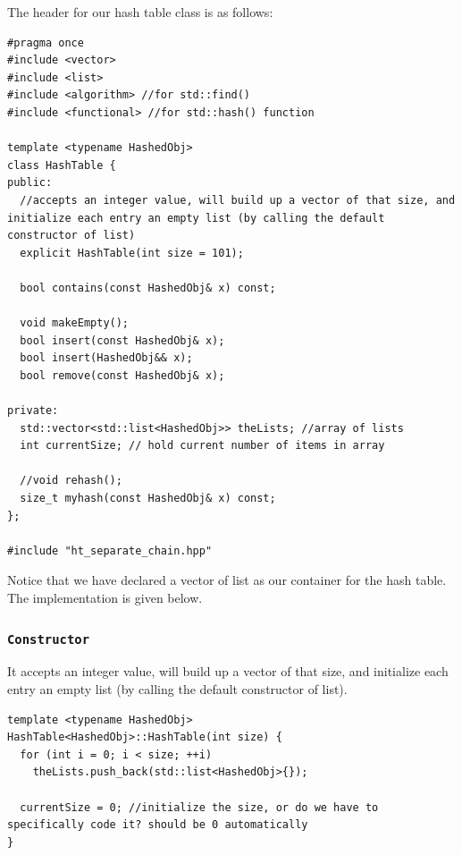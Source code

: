 \documentclass[11pt]{book}
\begin{document}
The header for our hash table class is as follows:
\begin{verbatim}
#pragma once
#include <vector>
#include <list>
#include <algorithm> //for std::find() 
#include <functional> //for std::hash() function

template <typename HashedObj>
class HashTable {
public:
  //accepts an integer value, will build up a vector of that size, and initialize each entry an empty list (by calling the default constructor of list)
  explicit HashTable(int size = 101);

  bool contains(const HashedObj& x) const;

  void makeEmpty();
  bool insert(const HashedObj& x);
  bool insert(HashedObj&& x);
  bool remove(const HashedObj& x);

private:
  std::vector<std::list<HashedObj>> theLists; //array of lists
  int currentSize; // hold current number of items in array

  //void rehash();
  size_t myhash(const HashedObj& x) const;
};

#include "ht_separate_chain.hpp"
\end{verbatim}

Notice that we have declared a vector of list as our container for the hash table. The implementation is given below.

\subsubsection{\texttt{Constructor}}
\label{sec:org948fda0}
It accepts an integer value, will build up a vector of that size, and initialize each entry an empty list (by calling the default constructor of list).
\begin{verbatim}
template <typename HashedObj>
HashTable<HashedObj>::HashTable(int size) {
  for (int i = 0; i < size; ++i)
    theLists.push_back(std::list<HashedObj>{});

  currentSize = 0; //initialize the size, or do we have to specifically code it? should be 0 automatically
}
\end{verbatim}
\end{document}
